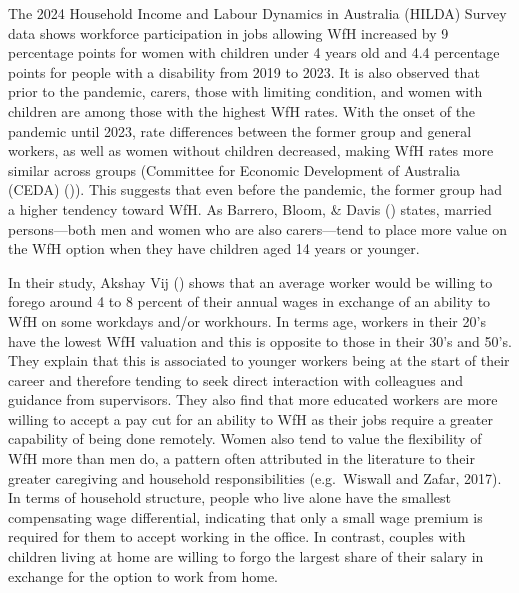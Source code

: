 \documentclass[
  a4paper,
]{article}
\numberwithin{equation}{section}
\numberwithin{figure}{section}
\numberwithin{table}{section}
\begin{document}
The 2024 Household Income and Labour Dynamics in Australia (HILDA) Survey data shows workforce participation in jobs allowing WfH increased by 9 percentage points for women with children under 4 years old and 4.4 percentage points for people with a disability from 2019 to 2023. It is also observed that prior to the pandemic, carers, those with limiting condition, and women with children are among those with the highest WfH rates. With the onset of the pandemic until 2023, rate differences between the former group and general workers, as well as women without children decreased, making WfH rates more similar across groups (Committee for Economic Development of Australia (CEDA) ()). This suggests that even before the pandemic, the former group had a higher tendency toward WfH. As Barrero, Bloom, \& Davis () states, married persons---both men and women who are also carers---tend to place more value on the WfH option when they have children aged 14 years or younger.

In their study, Akshay Vij () shows that an average worker would be willing to forego around 4 to 8 percent of their annual wages in exchange of an ability to WfH on some workdays and/or workhours. In terms age, workers in their 20's have the lowest WfH valuation and this is opposite to those in their 30's and 50's. They explain that this is associated to younger workers being at the start of their career and therefore tending to seek direct interaction with colleagues and guidance from supervisors. They also find that more educated workers are more willing to accept a pay cut for an ability to WfH as their jobs require a greater capability of being done remotely. Women also tend to value the flexibility of WfH more than men do, a pattern often attributed in the literature to their greater caregiving and household responsibilities (e.g.~Wiswall and Zafar, 2017). In terms of household structure, people who live alone have the smallest compensating wage differential, indicating that only a small wage premium is required for them to accept working in the office. In contrast, couples with children living at home are willing to forgo the largest share of their salary in exchange for the option to work from home.
\end{document}
